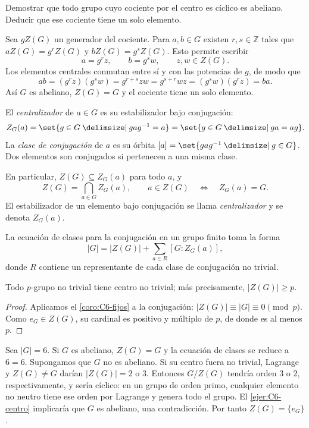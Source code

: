 \begin{ejer}\label{ejer:C6-centro}
Demostrar que todo grupo cuyo cociente por el centro es cíclico es abeliano. Deducir que ese cociente tiene un solo elemento.
\end{ejer}
\begin{sol}
Sea $gZ(G)$ un generador del cociente. Para $a,b\in G$ existen $r,s\in\mathbb Z$ tales que $aZ(G)=g^rZ(G)$ y $bZ(G)=g^sZ(G)$. Esto permite escribir
\[
a=g^rz,\qquad b=g^sw,\qquad z,w\in Z(G).
\]
Los elementos centrales conmutan entre sí y con las potencias de $g$, de modo que
\[
ab=(g^rz)(g^sw)=g^{r+s}zw
=g^{s+r}wz=(g^sw)(g^rz)=ba.
\]
Así $G$ es abeliano, $Z(G)=G$ y el cociente tiene un solo elemento.
\end{sol}

\begin{defi}
El \emph{centralizador} de $a\in G$ es su estabilizador bajo conjugación:
\[
Z_G(a)=\set{g\in G\given gag^{-1}=a}
=\set{g\in G\given ga=ag}.
\]
La \emph{clase de conjugación} de $a$ es su órbita $[a]=\set{gag^{-1}\given g\in G}$. Dos elementos son conjugados si pertenecen a una misma clase.
\end{defi}
En particular, $Z(G)\subseteq Z_G(a)$ para todo $a$, y
\[
Z(G)=\bigcap_{a\in G}Z_G(a),\qquad
a\in Z(G)\quad\Longleftrightarrow\quad Z_G(a)=G.
\]
El estabilizador de un elemento bajo conjugación se llama \emph{centralizador} y se denota $Z_G(a)$.

La ecuación de clases para la conjugación en un grupo finito toma la forma
\begin{equation}\label{eq:C6-conjugacion}
|G|=|Z(G)|+\sum_{a\in R}[G:Z_G(a)],
\end{equation}
donde $R$ contiene un representante de cada clase de conjugación no trivial.

\begin{coro}\label{coro:C6-centro-p}
Todo $p$-grupo no trivial tiene centro no trivial; más precisamente, $|Z(G)|\ge p$.
\end{coro}
\begin{proof}
Aplicamos el \cref{coro:C6-fijos} a la conjugación: $|Z(G)|\equiv|G|\equiv0\pmod p$. Como $e_G\in Z(G)$, su cardinal es positivo y múltiplo de $p$, de donde es al menos $p$.
\end{proof}

Sea $|G|=6$. Si $G$ es abeliano, $Z(G)=G$ y la ecuación de clases se reduce a $6=6$. Supongamos que $G$ no es abeliano. Si su centro fuera no trivial, Lagrange y $Z(G)\ne G$ darían $|Z(G)|=2$ o $3$. Entonces $G/Z(G)$ tendría orden $3$ o $2$, respectivamente, y sería cíclico: en un grupo de orden primo, cualquier elemento no neutro tiene ese orden por Lagrange y genera todo el grupo. El \cref{ejer:C6-centro} implicaría que $G$ es abeliano, una contradicción. Por tanto $Z(G)=\{e_G\}$.

